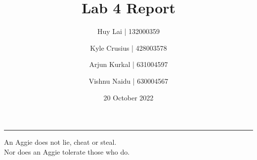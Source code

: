 \documentclass[fleqn,12pt]{article}
\title{\vspace{-2.5cm}Lab 4 Report}
\author{
    Huy Lai \hspace{20pt}   | 132000359     \and \vspace{-3em}
    Kyle Crusius            | 428003578     \and \vspace{-3em}
    Arjun Kurkal            | 631004597     \and \vspace{-3em}
    Vishnu Naidu            | 630004567
}
\affil{Texas A\&M University}
\date{\vspace{-28pt}20 October 2022}
\begin{document}
\maketitle
\begin{center}
\vspace{-42pt}
\rule{\textwidth}{.1pt}
{\large
An Aggie does not lie, cheat or steal.\\
Nor does an Aggie tolerate those who do.
}
\end{center}




\end{document}
